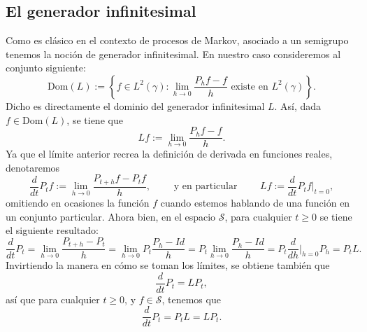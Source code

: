 \documentclass[letterpaper,twoside,12pt]{book}
\renewcommand{\S}{\mathcal{S}}
\newcommand{\1}{\mathds{1}}
\renewcommand{\to}{\rightarrow}
\theoremstyle{definition}
\theoremstyle{definition}
\theoremstyle{remark}
\theoremstyle{definition}
\theoremstyle{definition}
\theoremstyle{definition}
\theoremstyle{definition}
\theoremstyle{definition}
\begin{document}
\subsection{El generador infinitesimal}
 Como es clásico en el contexto de procesos de Markov, asociado a un semigrupo tenemos la noción de generador infinitesimal. En nuestro caso consideremos al conjunto siguiente:
 \[
 \text{Dom}(L):=\left\{f\in L^2(\gamma): \lim_{h\to 0} \frac{P_{h}f-f}{h} \text{ existe en } L^{2}(\gamma)\right\}.
 \]  
Dicho es directamente el dominio del generador infinitesimal $L$. Así, dada $f\in \text{Dom}(L)$, se tiene que 
\[
Lf:=\lim_{h\to 0}\frac{P_hf-f}{h}.    
\]
Ya que el límite anterior recrea la definición de derivada en funciones reales, denotaremos
\[
   \frac{d}{dt}P_tf:=\lim_{h\to0}\frac{P_{t+h}f-P_tf}{h}, \qquad \text{ y en particular } \qquad  Lf:=\frac{d}{dt}P_tf\bigg|_{t=0},
\]
omitiendo en ocasiones la función $f$ cuando estemos hablando de una función en un conjunto particular. Ahora bien, en el espacio $\S$, para cualquier $t\geq0$ se tiene el siguiente resultado:
\[
\frac{d}{dt}P_t=\lim_{h\to0}\frac{P_{t+h}-P_t}{h}=\lim_{h\to0}P_t\frac{P_h-Id}{h}=P_t\lim_{h\to0}\frac{P_h-Id}{h}=P_t\frac{d}{dh}\bigg|_{h=0}P_h=P_tL.
\]
Invirtiendo la manera en cómo se toman los límites, se obtiene también que
\[
\frac{d}{dt}P_t=LP_t,  
\]
así que para cualquier $t\geq0$, y $f\in \S$, tenemos que 
\[
\frac{d}{dt}P_t=P_tL=LP_t.
\]
\end{document}
